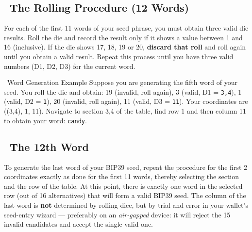 \documentclass[10pt]{article}
\begin{document}
\subsection*{~The Rolling Procedure (12 Words)}

For each of the first 11 words of your seed phrase, you must obtain three valid die results. Roll the die and record the result only if it shows a value between 1 and 16 (inclusive). If the die shows 17, 18, 19 or 20, \textbf{discard that roll} and roll again until you obtain a valid result. Repeat this process until you have three valid numbers (D1, D2, D3) for the current word.

\begin{examplebox}{\faLightbulb~Word Generation Example}
Suppose you are generating the fifth word of your seed. You roll the die and obtain: 19 (invalid, roll again), 3 (valid, D1 = \texttt{3,4}), 1 (valid, D2 = \texttt{1}), 20 (invalid, roll again), 11 (valid, D3 = \texttt{11}). Your coordinates are ((3,4), 1, 11). Navigate to section 3,4 of the table, find row 1 and then column 11 to obtain your word: \texttt{candy}.
\end{examplebox}

\subsection*{\faPen~The 12th Word}

To generate the last word of your BIP39 seed, repeat the procedure for the first 2 coordinates exactly as done for the first 11 words, thereby selecting the section and the row of the table. At this point, there is exactly one word in the selected row (out of 16 alternatives) that will form a valid BIP39 seed. The column of the last word is \textbf{not} determined by rolling dice, but by trial and error in your wallet's seed-entry wizard --- preferably on an \textit{air-gapped} device: it will reject the 15 invalid candidates and accept the single valid one.
\end{document}
